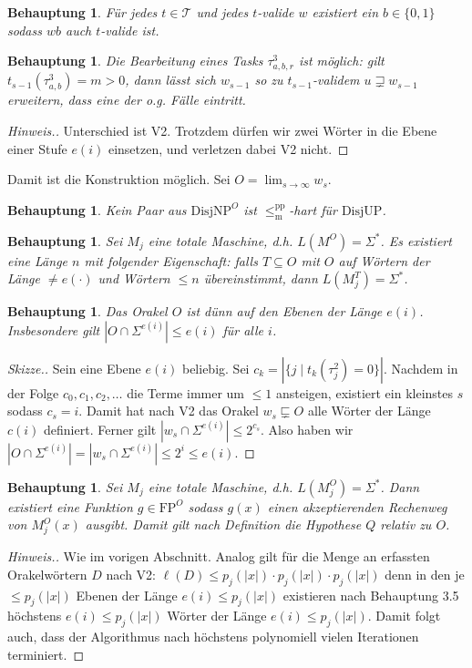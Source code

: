 \documentclass[nofonts]{uebung}
\newtheorem{claim}[theorem]{Behauptung}
\theoremstyle{definition}
\def\FP{\ensuremath{\mathrm{FP}}}
\def\DisjNP{\ensuremath{\mathrm{DisjNP}}}
\def\DisjUP{\ensuremath{\mathrm{DisjUP}}}
\def\leqmpp{\ensuremath{\leq_\mathrm{m}^\mathrm{pp}}}
\begin{document}
\begin{claim}
    Für jedes $t\in\mathcal T$ und jedes $t$-valide $w$ existiert ein $b\in\{0,1\}$ sodass $wb$ auch $t$-valide ist.
\end{claim}

\begin{claim}
    Die Bearbeitung eines Tasks $\tau^3_{a,b,r}$ ist möglich: gilt $t_{s-1}(\tau^3_{a,b})=m>0$, dann lässt sich $w_{s-1}$ so zu $t_{s-1}$-validem $u\sqsupsetneq w_{s-1}$ erweitern, dass eine der o.g. Fälle eintritt.
\end{claim}
\begin{proof}[Hinweis.]
    Unterschied ist V2. Trotzdem dürfen wir zwei Wörter in die Ebene einer Stufe $e(i)$ einsetzen, und verletzen dabei V2 nicht.
\end{proof}

Damit ist die Konstruktion möglich. Sei $O=\lim_{s\to\infty} w_s$.

\begin{claim}
    Kein Paar aus $\DisjNP^O$ ist $\leqmpp$-hart für $\DisjUP$.
\end{claim}


\begin{claim}
    Sei $M_j$ eine totale Maschine, d.h. $L(M^O)=\Sigma^*$.
    Es existiert eine Länge $n$ mit folgender Eigenschaft: 
    falls $T\subseteq O$ mit $O$ auf Wörtern der Länge $\neq e(\cdot)$ und Wörtern $\leq n$ übereinstimmt, dann $L(M_j^T)=\Sigma^*$.
\end{claim}

\begin{claim}
    Das Orakel $O$ ist dünn auf den Ebenen der Länge $e(i)$. Insbesondere gilt $|O\cap \Sigma^{e(i)}|\leq e(i)$ für alle $i$.
\end{claim}
\begin{proof}[Skizze.]
    Sein eine Ebene $e(i)$ beliebig.
    Sei $c_k=|\{j\mid t_{k}(\tau^2_j)=0 \}|$.
    Nachdem in der Folge $c_0, c_1, c_2, \dots$ die Terme immer um $\leq 1$ ansteigen, existiert ein kleinstes $s$ sodass $c_s=i$.
    Damit hat nach V2 das Orakel $w_s\sqsubsetneq O$ alle Wörter der Länge $c(i)$ definiert.
    Ferner gilt $|w_s\cap\Sigma^{e(i)}|\leq 2^{c_s}$.
    Also haben wir $|O\cap\Sigma^{e(i)}|=|w_s\cap\Sigma^{e(i)}|\leq 2^{i}\leq e(i)$.
\end{proof}

\begin{claim}
    Sei $M_j$ eine totale Maschine, d.h. $L(M_j^O)=\Sigma^*$. Dann existiert eine Funktion $g\in \FP^O$ sodass $g(x)$ einen akzeptierenden Rechenweg von $M^O_j(x)$ ausgibt. Damit gilt nach Definition die Hypothese $Q$ relativ zu $O$.
\end{claim}
\begin{proof}[Hinweis.]
    Wie im vorigen Abschnitt. Analog gilt für die Menge an erfassten Orakelwörtern $D$ nach V2: $\ell(D) \leq p_j(|x|)\cdot p_j(|x|)\cdot p_j(|x|)$ denn in den je $\leq p_j(|x|)$ Ebenen der Länge $e(i)\leq p_j(|x|)$ existieren nach Behauptung 3.5 höchstens $e(i)\leq p_j(|x|)$ Wörter der Länge $e(i)\leq p_j(|x|)$.
    Damit folgt auch, dass der Algorithmus nach höchstens polynomiell vielen Iterationen terminiert.
\end{proof}
\end{document}
